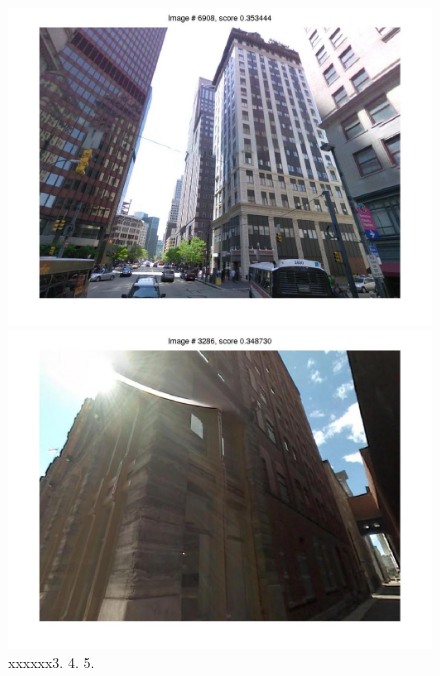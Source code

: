 \documentclass[10pt,onecolumn,A4]{article}
\begin{document}
\begin{figure}
\begin{minipage}{0.45\linewidth}
		\colorbox{myGreen}{\includegraphics[trim = 55mm 40mm 55mm 30mm, clip=true,width=0.30\linewidth]{sup2602/svm04.jpg}}
		\colorbox{myCopper5}{\includegraphics[trim = 55mm 40mm 55mm 30mm, clip=true,width=0.30\linewidth]{sup2602/svm05.jpg}}  \\
		\textcolor{myWhite}{xxxxxx}3. \hspace{0.25\linewidth}4. \hspace{0.25\linewidth}5. \\
	\end{minipage}
\end{figure}
\end{document}
